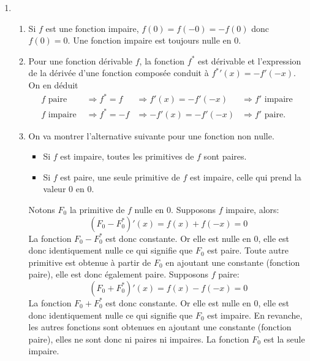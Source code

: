 \begin{enumerate}
 \item 
\begin{enumerate}
 \item Si $f$ est une fonction impaire, $f(0) = f(-0) = -f(0)$ donc $f(0)=0$. Une fonction impaire est toujours nulle en $0$.
 
 \item Pour une fonction dérivable $f$, la fonction $f^*$ est dérivable et l'expression de la dérivée d'une fonction composée conduit à ${f^*}'(x) = -f'(-x)$. On en déduit
\begin{align*}
 f \text{ paire } &\Rightarrow f^* = f &\Rightarrow f'(x) = -f'(-x) &\Rightarrow f' \text{ impaire }\\
 f \text{ impaire } &\Rightarrow f^* = -f &\Rightarrow -f'(x) = -f'(-x) &\Rightarrow f' \text{ paire. }
\end{align*}

 \item On va montrer l'alternative suivante pour une fonction non nulle.
\begin{itemize}
 \item Si $f$ est impaire, toutes les primitives de $f$ sont paires.
 \item Si $f$ est paire, une seule primitive de $f$ est impaire, celle qui prend la valeur $0$ en $0$.
\end{itemize}
Notons $F_0$ la primitive de $f$ nulle en $0$. Supposons $f$ impaire, alors:
\[
 (F_0-F_0^*)'(x) = f(x) + f(-x) = 0
\]
La fonction $F_0-F_0^*$ est donc constante. Or elle est nulle en $0$, elle est donc identiquement nulle ce qui signifie que $F_0$ est paire. Toute autre primitive est obtenue à partir de $F_0$ en ajoutant une constante (fonction paire), elle est donc également paire.\newline
Supposons $f$ paire:
\[
 (F_0+F_0^*)'(x) = f(x) - f(-x) = 0
\]
La fonction $F_0+F_0^*$ est donc constante. Or elle est nulle en $0$, elle est donc identiquement nulle ce qui signifie que $F_0$ est impaire. En revanche, les autres fonctions sont obtenues en ajoutant une constante (fonction paire), elles ne sont donc ni paires ni impaires. La fonction $F_0$ est la seule impaire.
\end{enumerate}


\end{enumerate}
